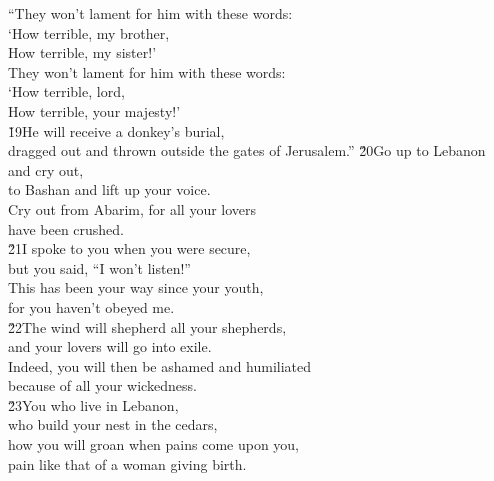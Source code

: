 \begin{poetry}
\poeml ``They won't lament for him with these words: \\
\poemll    `How terrible, my brother, \\
\poemlll       How terrible, my sister!' \\
\poeml They won't lament for him with these words: \\
\poemll    `How terrible, lord, \\
\poemlll       How terrible, your majesty!' \\
\poeml \v{19}He will receive a donkey's burial, \\
\poemll    dragged out and thrown outside the gates of Jerusalem.''
\poeml \v{20}Go up to Lebanon and cry out, \\
\poemll    to Bashan and lift up your voice. \\
\poeml Cry out from Abarim, for all your lovers \\
\poemll    have been crushed. \\
\poeml \v{21}I spoke to you when you were secure, \\
\poemll    but you said, ``I won't listen!'' \\
\poeml This has been your way since your youth, \\
\poemll    for you haven't obeyed me. \\
\poeml \v{22}The wind will shepherd all your shepherds, \\
\poemll    and your lovers will go into exile. \\
\poeml Indeed, you will then be ashamed and humiliated \\
\poemll    because of all your wickedness. \\
\poeml \v{23}You who live in Lebanon, \\
\poemll    who build your nest in the cedars, \\
\poeml how you will groan when pains come upon you, \\
\poemll    pain like that of a woman giving birth.
\end{poetry}

